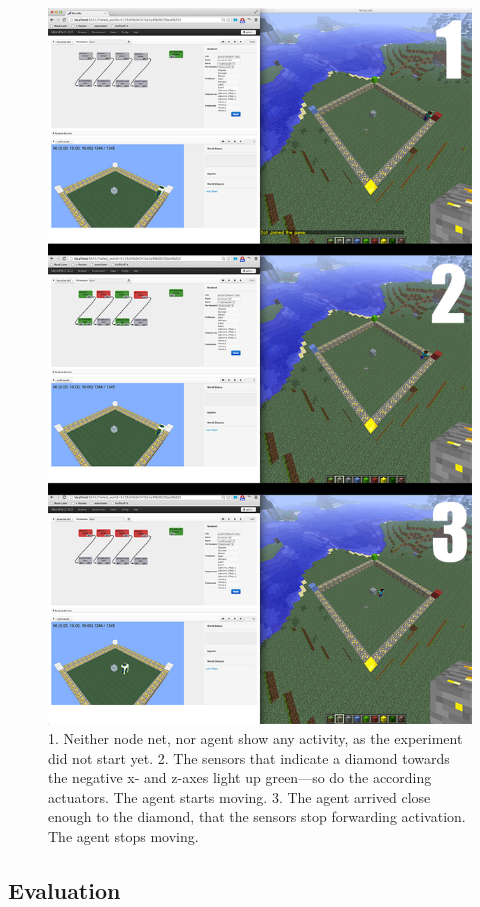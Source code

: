 \begin{figure}[h]
  \centering
    \includegraphics[width=12cm]{graphics/diamond_screens}
  \caption{1. Neither node net, nor agent show any activity, as the experiment did not start yet.  2. The sensors that indicate a diamond towards the negative x- and z-axes light up green---so do the according actuators. The agent starts moving.  3. The agent arrived close enough to the diamond, that the sensors stop forwarding activation. The agent stops moving.}
  \label{diamond_screens}
\end{figure}

        \subsection{Evaluation}
        
